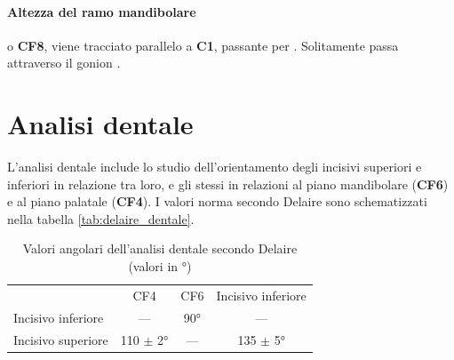 \paragraph{Altezza del ramo mandibolare} o \textbf{CF8}, viene tracciato parallelo a \textbf{C1}, passante per . Solitamente passa attraverso il gonion .

\section{Analisi dentale}
L'analisi dentale include lo studio dell'orientamento degli incisivi superiori e inferiori in relazione tra loro, e gli stessi in relazioni al piano mandibolare (\textbf{CF6}) e al piano palatale (\textbf{CF4}). I valori norma secondo Delaire sono schematizzati nella tabella \vref{tab:delaire_dentale}.

\begin{table}[h]
\centering
\caption{Valori angolari dell'analisi dentale secondo Delaire (valori in °)}
\label{tab:delaire_dentale}
\begin{tabular*}{.65\textwidth}{lccc}
\toprule
 & CF4 & CF6 & Incisivo inferiore \\
\cmidrule(r){2-4}
Incisivo inferiore & --- & 90° & --- \\
Incisivo superiore & 110 $\pm$ 2° & --- & 135 $\pm$ 5° \\
\bottomrule
\end{tabular*}
\end{table}
